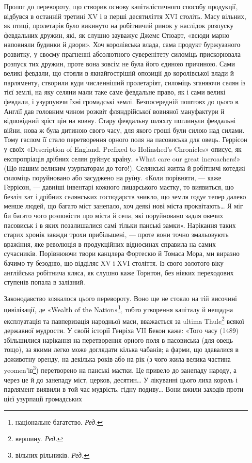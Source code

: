 Пролог до перевороту, що створив основу капіталістичного
способу продукції, відбувся в останній третині XV і в перші
десятиліття XVI століть. Масу вільних, як птиці, пролетарів
було викинуто на робітничий ринок у наслідок розпуску февдальних
дружин, які, як слушно зауважує Джемс Стюарт, «всюди
марно наповняли будинки й двори». Хоч королівська влада,
сама продукт буржуазного розвитку, у своєму прагненні абсолютного
суверенітету силоміць прискорювала розпуск тих дружин,
проте вона зовсім не була його єдиною причиною. Сами
великі февдали, що стояли в якнайгострішій опозиції до королівської
влади й парляменту, створили куди численніший пролетаріят,
силоміць зганяючи селян із тієї землі, на яку селяни
мали таке саме февдальне право, як і сами великі февдали, і
узурпуючи їхні громадські землі. Безпосередній поштовх до цього
в Англії дав головним чином розквіт фляндрійської вовняної
мануфактури й відповідний зріст цін на вовну. Стару февдальну
шляхту поглинули февдальні війни, нова ж була дитиною свого
часу, для якого гроші були силою над силами. Тому гаслом її
стало перетворення орного поля на пасовиська для овець. Геррісон
у своїх «Description of England. Prefixed to Holinshed’s
Chronicles» описує, як експропріація дрібних селян руйнує
країну. «What care our great incroachers!» (Що нашим великим
узурпаторам до того!). Селянські житла й робітничі котеджі
силоміць поруйновано або засуджено на руїну. «Коли порівняти, —
каже Геррісон, — давніші інвентарі кожного лицарського маєтку,
то виявиться, що безліч хат і дрібних селянських господарств
зникло, що земля годує тепер далеко менше людей, що багато
міст занепало, хоч деякі нові міста проквітають\dots{} Я міг би багато
чого розповісти про міста й села, які поруйновано задля
овечих пасовиськ і в яких позалишалися самі тільки панські
замки». Нарікання таких старих хронік завжди трохи прибільшені,
— проте вони точно змальовують вражіння, яке революція
в продукційних відносинах справила на самих сучасників.
Порівнюючи твори канцлера Фортескю й Томаса Мора, ми виразно
бачимо ту безодню, що відділяє XV і XVI століття. Із свого
золотого віку англійська робітнича кляса, як слушно каже Торнтон,
без ніяких переходових ступенів попала в залізний.

Законодавство злякалося цього перевороту. Воно ще не
стояло на тій височині цивілізації, де «Wealth of the Nation»\footnote*{
національне багатство. \emph{Ред.}
},
тобто утворення капіталу й нещадна експлуатація та павперизація
народньої маси, вважається за ultima Thule\footnote*{
вершину. \emph{Ред.}
} всякої державної
мудрости. У своїй історії Генріха VII Бекон каже: «Того
часу (1489) збільшилися нарікання на перетворення орного поля
в пасовиська (для овець тощо), за якими легко може доглядати
кілька чабанів; а фарми, що здавалися в доживотну оренду, на декілька
років або на рік (з чого жила велика частина yeomen’ів\footnote*{
вільних рільників. \emph{Ред.}
})
перетворено на панські маєтки. Це привело до занепаду народу,
а через це й до занепаду міст, церков, десятин\dots{} У лікуванні
цього лиха король і парлямент виявили в той час мудрість, гідну
подиву\dots{} Вони вжили заходів проти цієї узурпації громадських
\parbreak{}  %
